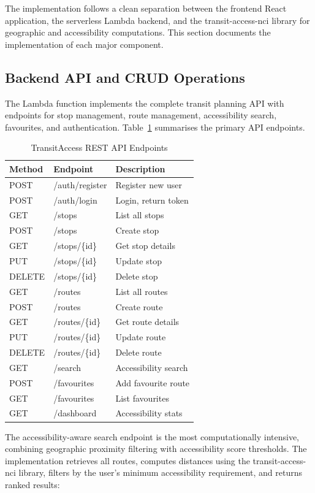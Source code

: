\documentclass[conference]{IEEEtran}
\begin{document}
The implementation follows a clean separation between the frontend React application, the serverless Lambda backend, and the transit-access-nci library for geographic and accessibility computations. This section documents the implementation of each major component.

\subsection{Backend API and CRUD Operations}

The Lambda function implements the complete transit planning API with endpoints for stop management, route management, accessibility search, favourites, and authentication. Table~\ref{tab:endpoints} summarises the primary API endpoints.

\begin{table}[H]
\centering
\caption{TransitAccess REST API Endpoints}
\label{tab:endpoints}
\begin{tabular}{|l|l|l|}
\hline
\textbf{Method} & \textbf{Endpoint} & \textbf{Description} \\
\hline
POST & /auth/register & Register new user \\
POST & /auth/login & Login, return token \\
\hline
GET & /stops & List all stops \\
POST & /stops & Create stop \\
GET & /stops/\{id\} & Get stop details \\
PUT & /stops/\{id\} & Update stop \\
DELETE & /stops/\{id\} & Delete stop \\
\hline
GET & /routes & List all routes \\
POST & /routes & Create route \\
GET & /routes/\{id\} & Get route details \\
PUT & /routes/\{id\} & Update route \\
DELETE & /routes/\{id\} & Delete route \\
\hline
GET & /search & Accessibility search \\
POST & /favourites & Add favourite route \\
GET & /favourites & List favourites \\
GET & /dashboard & Accessibility stats \\
\hline
\end{tabular}
\end{table}

The accessibility-aware search endpoint is the most computationally intensive, combining geographic proximity filtering with accessibility score thresholds. The implementation retrieves all routes, computes distances using the transit-access-nci library, filters by the user's minimum accessibility requirement, and returns ranked results:
\end{document}

